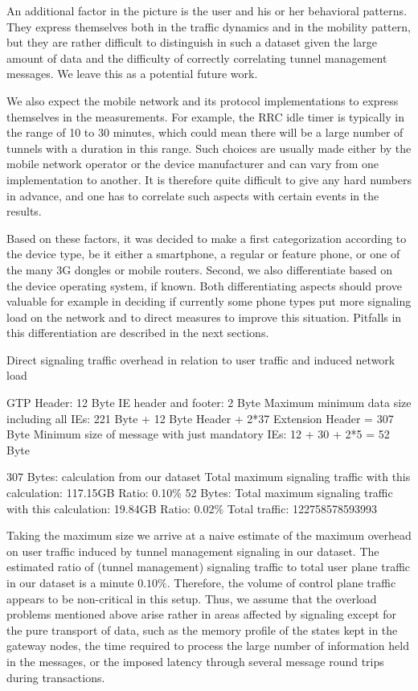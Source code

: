 An additional factor in the picture is the user and his or her behavioral patterns. They express themselves both in the traffic dynamics and in the mobility pattern, but they are rather difficult to distinguish in such a dataset given the large amount of data and the difficulty of correctly correlating tunnel management messages. We leave this as a potential future work.

We also expect the mobile network and its protocol implementations to express themselves in the measurements. For example, the \gls{RRC} idle timer is typically in the range of 10 to 30 minutes, which could mean there will be a large number of tunnels with a duration in this range. Such choices are usually made either by the mobile network operator or the device manufacturer and can vary from one implementation to another. It is therefore quite difficult to give any hard numbers in advance, and one has to correlate such aspects with certain events in the results.

Based on these factors, it was decided to make a first categorization according to the device type, be it either a smartphone, a regular or feature phone, or one of the many 3G dongles or mobile routers. Second, we also differentiate based on the device operating system, if known. Both differentiating aspects should prove valuable for example in deciding if currently some phone types put more signaling load on the network and to direct measures to improve this situation. Pitfalls in this differentiation are described in the next sections.




Direct signaling traffic overhead in relation to user traffic and induced network load

GTP Header: 12 Byte
IE header and footer: 2 Byte
Maximum minimum data size including all \glspl{IE}: 221 Byte + 12 Byte Header + 2*37 Extension Header = 307 Byte
Minimum size of message with just mandatory \glspl{IE}: 12 + 30 + 2*5 = 52 Byte

307 Bytes:
calculation from our dataset
Total maximum signaling traffic with this calculation: 117.15GB
Ratio: 0.10\%
52 Bytes:
Total maximum signaling traffic with this calculation: 19.84GB
Ratio: 0.02\%
Total traffic: 122758578593993


Taking the maximum size we arrive at a naive estimate of the maximum overhead on user traffic induced by tunnel management signaling in our dataset. The estimated ratio of (tunnel management) signaling traffic to total user plane traffic in our dataset is a minute $0.10\%$. Therefore, the volume of control plane traffic appears to be non-critical in this setup. Thus, we assume that the overload problems mentioned above arise rather in areas affected by signaling except for the pure transport of data, such as the memory profile of the states kept in the gateway nodes, the time required to process the large number of information held in the messages, or the imposed latency through several message round trips during transactions.

